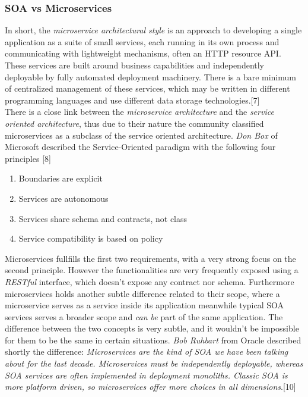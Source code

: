 \subsubsection{SOA vs Microservices}
In short, the \textit{microservice architectural style} is an approach to developing a single
application as a suite of small services, each running in its own process and communicating with
lightweight mechanisms, often an HTTP resource API. These services are built around business capabilities
and independently deployable by fully automated deployment machinery. There is
a bare minimum of centralized management of these services,
which may be written in different programming languages and use different data storage technologies.[7]\\
There is a close link between the \textit{microservice architecture} and the \textit{service oriented architecture},
thus due to their nature the community classified microservices as a subclass of the service oriented architecture.
\textit{Don Box} of Microsoft described the Service-Oriented paradigm with the following four principles [8]

\begin{enumerate}
  \item Boundaries are explicit
  \item Services are autonomous
  \item Services share schema and contracts, not class
  \item Service compatibility is based on policy
\end{enumerate}

Microservices fullfills the first two requirements, with a very strong focus on the second principle.
However the functionalities are very frequently exposed using a \textit{RESTful} interface, which
doesn't expose any contract nor schema. Furthermore microservices holds another subtle difference related to their
scope, where a microservice serves as a service inside its application meanwhile typical SOA services
serves a broader scope and \textit{can be} part of the same application.
The difference between the two concepts is very subtle, and it wouldn't be impossible for them
to be the same in certain situations. \textit{Bob Ruhbart} from Oracle described shortly the difference:
\textit{Microservices are the kind of SOA we have been talking about for the last decade. Microservices must be independently deployable,
whereas SOA services are often implemented in deployment monoliths.
Classic SOA is more platform driven, so microservices offer more choices
in all dimensions}.[10]

